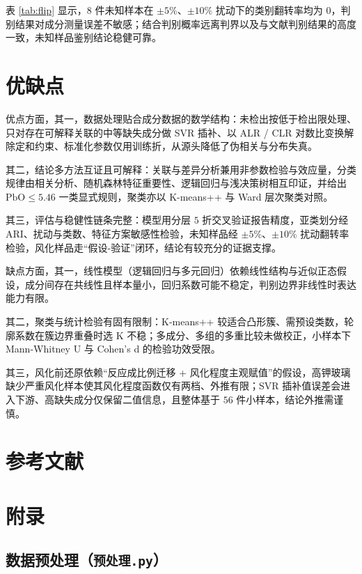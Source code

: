 \documentclass{ctexart}
\begin{document}
表 \ref{tab:flip} 显示，$8$ 件未知样本在 $\pm5\%$、$\pm10\%$ 扰动下的类别翻转率均为 $0$，判别结果对成分测量误差不敏感；结合判别概率远离判界以及与文献判别结果的高度一致，未知样品鉴别结论稳健可靠。

\section{优缺点}

优点方面，其一，数据处理贴合成分数据的数学结构：未检出按低于检出限处理、只对存在可解释关联的中等缺失成分做 SVR 插补、以 ALR / CLR 对数比变换解除定和约束、标准化参数仅用训练折，从源头降低了伪相关与分布失真。

其二，结论多方法互证且可解释：关联与差异分析兼用非参数检验与效应量，分类规律由相关分析、随机森林特征重要性、逻辑回归与浅决策树相互印证，并给出 $\mathrm{PbO}\le5.46$ 一类显式规则，聚类亦以 K-means++ 与 Ward 层次聚类对照。

其三，评估与稳健性链条完整：模型用分层 $5$ 折交叉验证报告精度，亚类划分经 ARI、扰动与类数、特征方案敏感性检验，未知样品经 $\pm5\%$、$\pm10\%$ 扰动翻转率检验，风化样品走“假设-验证”闭环，结论有较充分的证据支撑。

缺点方面，其一，线性模型（逻辑回归与多元回归）依赖线性结构与近似正态假设，成分间存在共线性且样本量小，回归系数可能不稳定，判别边界非线性时表达能力有限。

其二，聚类与统计检验有固有限制：K-means++ 较适合凸形簇、需预设类数，轮廓系数在簇边界重叠时选 K 不稳；多成分、多组的多重比较未做校正，小样本下 Mann-Whitney U 与 Cohen's d 的检验功效受限。

其三，风化前还原依赖“反应成比例迁移 + 风化程度主观赋值”的假设，高钾玻璃缺少严重风化样本使其风化程度函数仅有两档、外推有限；SVR 插补值误差会进入下游、高缺失成分仅保留二值信息，且整体基于 $56$ 件小样本，结论外推需谨慎。

\section{参考文献}

\printbibliography[heading=none]

\newpage

\section{附录}

\subsection{数据预处理（\normalfont\texttt{预处理.py}）}
\label{app:pre}
\end{document}
